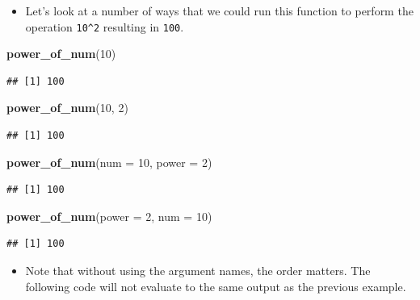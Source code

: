\documentclass[]{book}
\newenvironment{Shaded}{\begin{snugshade}}{\end{snugshade}}
\newcommand{\KeywordTok}[1]{\textcolor[rgb]{0.13,0.29,0.53}{\textbf{#1}}}
\newcommand{\DataTypeTok}[1]{\textcolor[rgb]{0.13,0.29,0.53}{#1}}
\newcommand{\DecValTok}[1]{\textcolor[rgb]{0.00,0.00,0.81}{#1}}
\newcommand{\NormalTok}[1]{#1}
\providecommand{\tightlist}{%
  \setlength{\itemsep}{0pt}\setlength{\parskip}{0pt}}
\begin{document}
\begin{itemize}
\tightlist
\item
  Let's look at a number of ways that we could run this function to
  perform the operation \texttt{10\^{}2} resulting in \texttt{100}.
\end{itemize}

\begin{Shaded}
\begin{Highlighting}[]
\KeywordTok{power_of_num}\NormalTok{(}\DecValTok{10}\NormalTok{)}
\end{Highlighting}
\end{Shaded}

\begin{verbatim}
## [1] 100
\end{verbatim}

\begin{Shaded}
\begin{Highlighting}[]
\KeywordTok{power_of_num}\NormalTok{(}\DecValTok{10}\NormalTok{, }\DecValTok{2}\NormalTok{)}
\end{Highlighting}
\end{Shaded}

\begin{verbatim}
## [1] 100
\end{verbatim}

\begin{Shaded}
\begin{Highlighting}[]
\KeywordTok{power_of_num}\NormalTok{(}\DataTypeTok{num =} \DecValTok{10}\NormalTok{, }\DataTypeTok{power =} \DecValTok{2}\NormalTok{)}
\end{Highlighting}
\end{Shaded}

\begin{verbatim}
## [1] 100
\end{verbatim}

\begin{Shaded}
\begin{Highlighting}[]
\KeywordTok{power_of_num}\NormalTok{(}\DataTypeTok{power =} \DecValTok{2}\NormalTok{, }\DataTypeTok{num =} \DecValTok{10}\NormalTok{)}
\end{Highlighting}
\end{Shaded}

\begin{verbatim}
## [1] 100
\end{verbatim}

\begin{itemize}
\tightlist
\item
  Note that without using the argument names, the order matters. The
  following code will not evaluate to the same output as the previous
  example.
\end{itemize}
\end{document}
